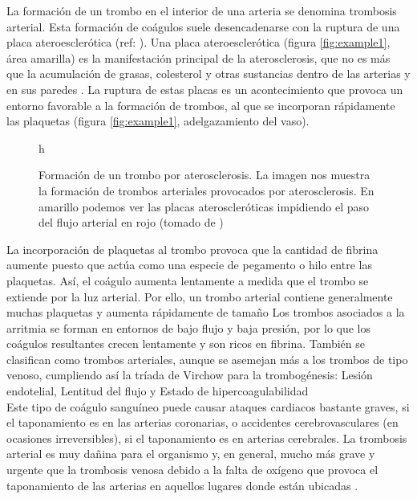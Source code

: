 
La formación de un trombo en el interior de una arteria se denomina trombosis arterial. Esta formación de coágulos suele desencadenarse con la ruptura de una placa ateroesclerótica (ref: \cite{Trombosis_Bayer}). Una placa ateroesclerótica (figura \ref{fig:example1}, área amarilla) es la manifestación principal de la aterosclerosis, que no es más que la acumulación de grasas, colesterol y otras sustancias dentro de las arterias y en sus paredes \cite{Aterosclerosis_inflamacion}. La ruptura de estas placas es un acontecimiento que provoca un entorno favorable a la formación de trombos, al que se incorporan rápidamente las plaquetas (figura \ref{fig:example1}, adelgazamiento del vaso).

\begin{figure}h
    \centering
	\textwidth{figures/aterosclerosis.jpg}
	\caption{Formación de un trombo por aterosclerosis. La imagen nos muestra la formación de trombos arteriales provocados por aterosclerosis. En amarillo podemos ver las placas ateroscleróticas impidiendo el paso del flujo arterial en rojo (tomado de \cite{imagen_trombo})}
	\label{fig:Figura 1}
  \end{figure}
  
La incorporación de plaquetas al trombo provoca que la cantidad de fibrina aumente puesto que actúa como una especie de pegamento o hilo entre las plaquetas. Así, el coágulo aumenta lentamente a medida que el trombo se extiende por la luz arterial. Por ello, un trombo arterial contiene generalmente muchas plaquetas y aumenta rápidamente de tamaño \cite{Aterosclerosis_inflamacion}\cite{Trombosis_Bayer}
Los trombos asociados a la arritmia se forman en entornos de bajo flujo y baja presión, por lo que los coágulos resultantes crecen lentamente y son ricos en fibrina. También se clasifican como trombos arteriales, aunque se asemejan más a los trombos de tipo venoso, cumpliendo así la tríada de Virchow \cite{Triada_Virchow} para la trombogénesis: Lesión endotelial, Lentitud del flujo y Estado de hipercoagulabilidad
\\

Este tipo de coágulo sanguíneo puede causar ataques cardiacos bastante graves, si el taponamiento es en las arterias coronarias, o accidentes cerebrovasculares (en ocasiones irreversibles), si el taponamiento es en arterias cerebrales. La trombosis arterial es muy dañina para el organismo y, en general, mucho más grave y urgente que la trombosis venosa debido a la falta de oxígeno que provoca el taponamiento de las arterias en aquellos lugares donde están ubicadas \cite{Trombosis_Bayer}. 
	
